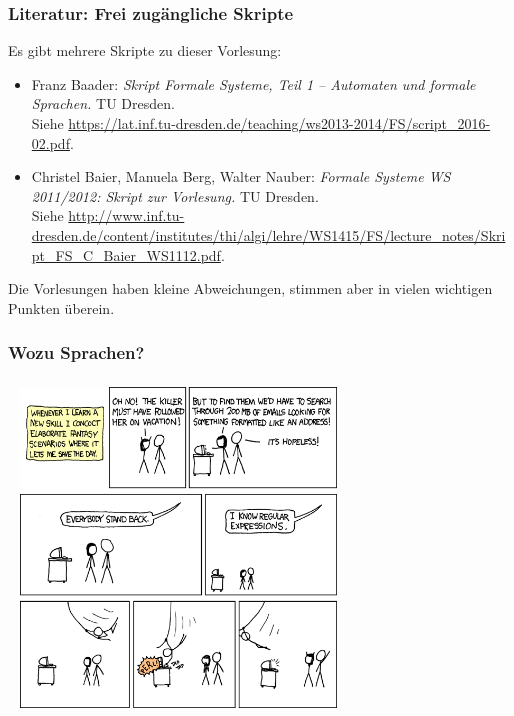 \documentclass[onlymath]{beamer}
\begin{document}
\begin{frame}\frametitle{Literatur: Frei zugängliche Skripte}

Es gibt mehrere Skripte zu dieser Vorlesung:
\begin{itemize}
\item Franz Baader: \emph{Skript Formale Systeme, Teil 1 -- Automaten und formale Sprachen.} TU Dresden.
\\{\tiny Siehe \url{https://lat.inf.tu-dresden.de/teaching/ws2013-2014/FS/script_2016-02.pdf}}.
\item Christel Baier, Manuela Berg, Walter Nauber: \emph{Formale Systeme WS 2011/2012: Skript zur Vorlesung.} TU Dresden.
 \\{\tiny Siehe \url{http://www.inf.tu-dresden.de/content/institutes/thi/algi/lehre/WS1415/FS/lecture_notes/Skript_FS_C_Baier_WS1112.pdf}}.
\end{itemize}

Die Vorlesungen haben kleine Abweichungen, stimmen aber in vielen wichtigen Punkten überein.

\end{frame}



\begin{frame}\frametitle{Wozu Sprachen?}

\end{frame}

\begin{frame}\frametitle{}

~\hfill
\includegraphics[height=8.5cm]{images/xkcd-regexps}
\hfill~

\end{frame}
\end{document}
